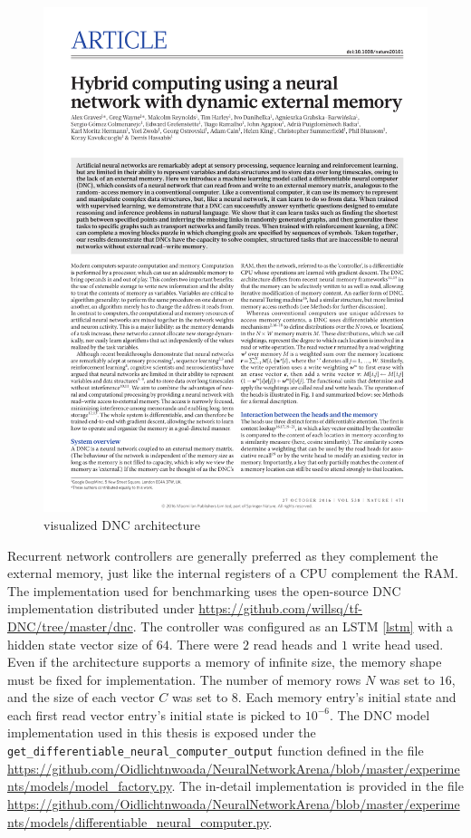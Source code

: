 \documentclass[draft,final]{vutinfth} %
\begin{document}
\begin{figure}[H]
\centering{}
\includegraphics[page=2,width=\linewidth,trim={125 550 130 55},clip]{literature/hybrid_computing_using_a_neural_network_with_dynamic_external_memory.pdf}
\caption{visualized DNC architecture \cite[p. 2]{DNC}}
\label{fig:dnc_vis}
\end{figure}
Recurrent network controllers are generally preferred as they complement the external memory, just like the internal registers of a CPU complement the RAM.
The implementation used for benchmarking uses the open-source DNC implementation distributed under \url{https://github.com/willsq/tf-DNC/tree/master/dnc}.
The controller was configured as an LSTM \ref{lstm} with a hidden state vector size of $64$. There were $2$ read heads and $1$ write head used.
Even if the architecture supports a memory of infinite size, the memory shape must be fixed for implementation.
The number of memory rows $N$ was set to $16$, and the size of each vector $C$ was set to $8$.
Each memory entry's initial state and each first read vector entry's initial state is picked to $10^{-6}$.
The DNC model implementation used in this thesis is exposed under the \texttt{get\_differentiable\_neural\_computer\_output} function defined in the file \url{https://github.com/Oidlichtnwoada/NeuralNetworkArena/blob/master/experiments/models/model_factory.py}.
The in-detail implementation is provided in the file \url{https://github.com/Oidlichtnwoada/NeuralNetworkArena/blob/master/experiments/models/differentiable_neural_computer.py}.
\end{document}
